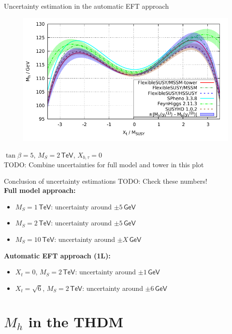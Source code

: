 \documentclass[hyperref={pdfpagelabels=false},ngerman]{beamer}
\newcommand{\eh}[1]{\,\mathsf{#1}}
\renewcommand{\emph}{\textbf}
\begin{document}
\begin{frame}{Uncertainty estimation in the automatic EFT approach}
  \begin{figure}
    \centering
    \includegraphics[width=\textwidth]{plots/xt_MSSM_MS-2000_uncertainty}
  \end{figure}
  $\tan\beta = 5$, $M_S = 2\eh{TeV}$, $X_{b,\tau} = 0$
  \\TODO: Combine uncertainties for full model and tower in this plot
\end{frame}

\begin{frame}{Conclusion of uncertainty estimations}
  TODO: Check these numbers!\\
  \emph{Full model approach:}
  \begin{itemize}
  \item $M_S = 1\eh{TeV}$: uncertainty around $\pm 5\eh{GeV}$
  \item $M_S = 2\eh{TeV}$: uncertainty around $\pm 5\eh{GeV}$
  \item $M_S = 10\eh{TeV}$: uncertainty around $\pm X\eh{GeV}$
  \end{itemize}
  \emph{Automatic EFT approach (1L):}
  \begin{itemize}
  \item $X_t = 0$, $M_S = 2\eh{TeV}$: uncertainty around $\pm 1\eh{GeV}$
  \item $X_t = \sqrt{6}$, $M_S = 2\eh{TeV}$: uncertainty around $\pm 6\eh{GeV}$
  \end{itemize}
\end{frame}


\section{$M_h$ in the THDM}
\end{document}
